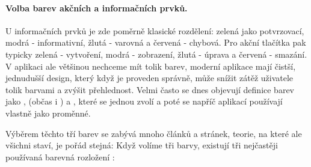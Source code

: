 \paragraph{Volba barev akčních a informačních prvků.} U informačních prvků je zde poměrně klasické rozdělení: zelená jako potvrzovací, modrá - informativní, žlutá - varovná a červená - chybová. Pro akční tlačítka pak typicky zelená - vytvoření, modrá - zobrazení, žlutá - úprava a červená - smazání. V aplikaci ale většinou nechceme mít tolik barev, moderní aplikace mají čistší, jednudušší design, který když je proveden správně, může snížit zátěž uživatele tolik barvami a zvýšit přehlednost. Velmi často se dnes objevují definice barev jako ,  (občas i ) a , které se jednou zvolí a poté se napříč aplikací používají vlastně jako proměnné.

Výběrem těchto tří barev se zabývá mnoho článků a stránek, teorie, na které ale všichni staví, je pořád stejná: Když volíme tři barvy, existují tři nejčastěji používaná barevná rozložení \cite{color-scheme-pick}:

